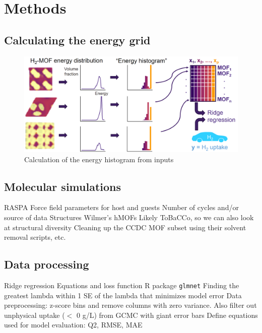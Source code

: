 \documentclass[letterpaper]{article}
\begin{document}
\section{Methods}

\subsection{Calculating the energy grid}

\begin{figure}[H]
	\centering
	\includegraphics[width=0.75\columnwidth]{Figs/energy_schematic.png}
	\caption{Calculation of the energy histogram from inputs}
	\label{fig:schematic}
\end{figure}


\subsection{Molecular simulations}

\begin{outline}
	\1 RASPA
	\1 Force field parameters for host and guests
	\1 Number of cycles and/or source of data
	\1 Structures
		\2 Wilmer's hMOFs
		\2 Likely ToBaCCo, so we can also look at structural diversity
		\2 Cleaning up the CCDC MOF subset using their solvent removal scripts, etc.
\end{outline}


\subsection{Data processing}

\begin{outline}
	\1 Ridge regression
		\2 Equations and loss function
		\2 R package \verb|glmnet|
			\3 Finding the greatest lambda within 1 SE of the lambda that minimizes model error
	\1 Data preprocessing: z-score bins and remove columns with zero variance.  Also filter out unphysical uptake ($<$ 0 g/L) from GCMC with giant error bars
	\1 Define equations used for model evaluation: Q2, RMSE, MAE
\end{outline}
\end{document}
